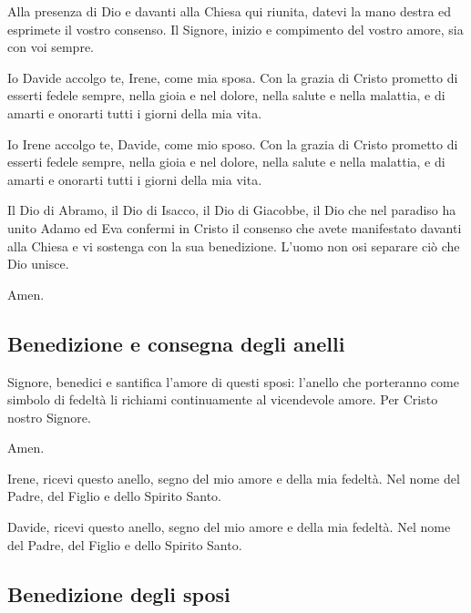 	\begin{dialoghi}
		\item[\sacerdote] Alla presenza di Dio e davanti alla Chiesa qui riunita, datevi la mano destra ed esprimete il vostro consenso. Il Signore, inizio e compimento del vostro amore, sia con voi sempre.
		\item[\sposo] Io Davide accolgo te, Irene, come mia sposa. Con la grazia di Cristo prometto di esserti fedele sempre, nella gioia e nel dolore, nella salute e nella malattia, e di amarti e onorarti tutti i giorni della mia vita.
		\item[\sposa] Io Irene accolgo te, Davide, come mio sposo. Con la grazia di Cristo prometto di esserti fedele sempre, nella gioia e nel dolore, nella salute e nella malattia, e di amarti e onorarti tutti i giorni della mia vita.
		\item[\sacerdote] Il Dio di Abramo, il Dio di Isacco, il Dio di Giacobbe, il Dio che nel paradiso ha unito Adamo ed Eva confermi in Cristo il consenso che avete manifestato davanti alla Chiesa e vi sostenga con la sua benedizione. L'uomo non osi separare ciò che Dio unisce.
		\item[\assemblea] Amen.
	\end{dialoghi}

\subsection*{Benedizione e consegna degli anelli}

	\begin{dialoghi}
		\item[\sacerdote] Signore, benedici e santifica l'amore di questi sposi: l'anello che porteranno come simbolo di fedeltà li richiami continuamente al vicendevole amore. Per Cristo nostro Signore.
		\item[\assemblea] Amen.
		\item[\sposo] Irene, ricevi questo anello, segno del mio amore e della mia fedeltà. Nel nome del Padre, del Figlio e dello Spirito Santo.
		\item[\sposa] Davide, ricevi questo anello, segno del mio amore e della mia fedeltà. Nel nome del Padre, del Figlio e dello Spirito Santo.
	\end{dialoghi}

\subsection*{Benedizione degli sposi}

